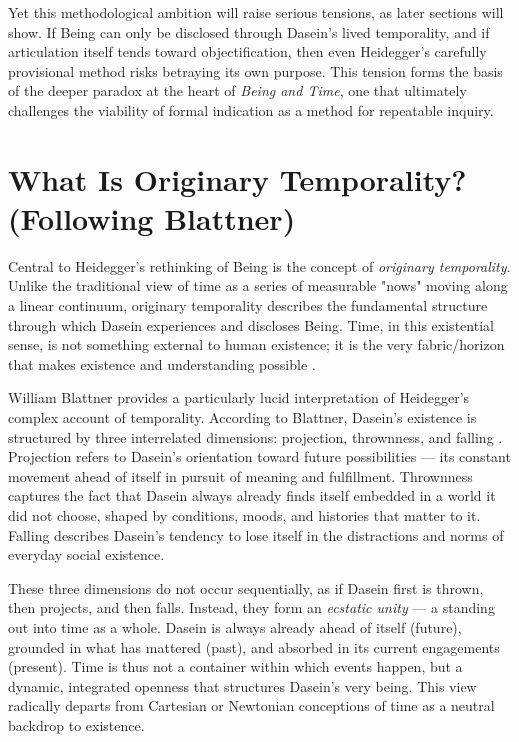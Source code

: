 \documentclass{article}
\begin{document}
Yet this methodological ambition will raise serious tensions, as later sections will show. If Being can only be disclosed through Dasein's lived temporality, and if articulation itself tends toward objectification, then even Heidegger's carefully provisional method risks betraying its own purpose. This tension forms the basis of the deeper paradox at the heart of \textit{Being and Time}, one that ultimately challenges the viability of formal indication as a method for repeatable inquiry.

\section*{What Is Originary Temporality? \\ (Following Blattner)}

Central to Heidegger's rethinking of Being is the concept of \textit{originary temporality}. Unlike the traditional view of time as a series of measurable "nows" moving along a linear continuum, originary temporality describes the fundamental structure through which Dasein experiences and discloses Being. Time, in this existential sense, is not something external to human existence; it is the very fabric/horizon that makes existence and understanding possible \parencite[p.~39]{heidegger1962}.

William Blattner provides a particularly lucid interpretation of Heidegger's complex account of temporality. According to Blattner, Dasein's existence is structured by three interrelated dimensions: projection, thrownness, and falling \parencite[pp.~311--312]{blattner2007}. Projection refers to Dasein's orientation toward future possibilities --- its constant movement ahead of itself in pursuit of meaning and fulfillment. Thrownness captures the fact that Dasein always already finds itself embedded in a world it did not choose, shaped by conditions, moods, and histories that matter to it. Falling describes Dasein's tendency to lose itself in the distractions and norms of everyday social existence.

These three dimensions do not occur sequentially, as if Dasein first is thrown, then projects, and then falls. Instead, they form an \textit{ecstatic unity} --- a standing out into time as a whole. Dasein is always already ahead of itself (future), grounded in what has mattered (past), and absorbed in its current engagements (present). Time is thus not a container within which events happen, but a dynamic, integrated openness that structures Dasein's very being. This view radically departs from Cartesian or Newtonian conceptions of time as a neutral backdrop to existence.
\end{document}
